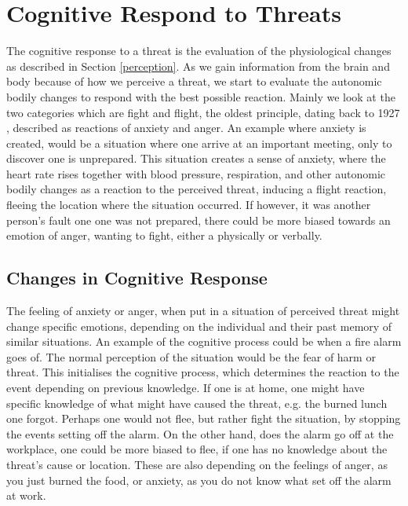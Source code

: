 \section{Cognitive Respond to Threats}\label{cognition}
The cognitive response to a threat is the evaluation of the physiological changes as described in Section \ref{perception}. As we gain information from the brain and body because of how we perceive a threat, we start to evaluate the autonomic bodily changes to respond with the best possible reaction. Mainly we look at the two categories which are fight and flight, the oldest principle, dating back to 1927 \cite{bodily_changes}, described as reactions of anxiety and anger. An example where anxiety is created, would be a situation where one arrive at an important meeting, only to discover one is unprepared. This situation creates a sense of anxiety, where the heart rate rises together with blood pressure, respiration, and other autonomic bodily changes as a reaction to the perceived threat, inducing a flight reaction, fleeing the location where the situation occurred. If however, it was another person's fault one one was not prepared, there could be more biased towards an emotion of anger, wanting to fight, either a physically or verbally. \cite{bodily_changes}

\subsection{Changes in Cognitive Response}\label{cognitive_response}
The feeling of anxiety or anger, when put in a situation of perceived threat might change specific emotions, depending on the individual and their past memory of similar situations. An example of the cognitive process could be when a fire alarm goes of. The normal perception of the situation would be the fear of harm or threat. This initialises the cognitive process, which determines the reaction to the event depending on previous knowledge. If one is at home, one might have specific knowledge of what might have caused the threat, e.g. the burned lunch one forgot. Perhaps one would not flee, but rather fight the situation, by stopping the events setting off the alarm. On the other hand, does the alarm go off at the workplace, one could be more biased to flee, if one has no knowledge about the threat’s cause or location. These are also depending on the feelings of anger, as you just burned the food, or anxiety, as you do not know what set off the alarm at work.\cite{bodily_changes}

